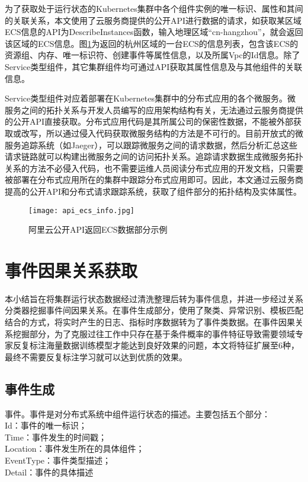 为了获取处于运行状态的Kubernetes集群中各个组件实例的唯一标识、属性和其间的关联关系，本文使用了云服务商提供的公开API进行数据的请求，如获取某区域ECS信息的API为DescribeInstances函数，输入地理区域“cn-hangzhou”，就会返回该区域的ECS信息。图\ref{api_ecs_info}为返回的杭州区域的一台ECS的信息列表，包含该ECS的资源组、内存、唯一标识符、创建事件等属性信息，以及所属Vpc的Id信息。除了Service类型组件，其它集群组件均可通过API获取其属性信息及与其他组件的关联信息。

Service类型组件对应着部署在Kubernetes集群中的分布式应用的各个微服务。微服务之间的拓扑关系与开发人员编写的应用架构结构有关，无法通过云服务商提供的公开API直接获取。分布式应用代码是其所属公司的保密性数据，不能被外部获取或改写，所以通过侵入代码获取微服务结构的方法是不可行的。目前开放式的微服务追踪系统（如Jaeger\cite{mengistu2020distributed}），可以跟踪微服务之间的请求数据，然后分析汇总这些请求链路就可以构建出微服务之间的访问拓扑关系。追踪请求数据生成微服务拓扑关系的方法不必侵入代码，也不需要运维人员阅读分布式应用的开发文档，只需要被部署在分布式应用所在的集群中跟踪分布式应用即可。因此，本文通过云服务商提高的公开API和分布式请求跟踪系统，获取了组件部分的拓扑结构及实体属性。
\begin{figure}[htbp]
    \centering
    \texttt{[image: api\_ecs\_info.jpg]}
    \caption{阿里云公开API返回ECS数据部分示例\label{api_ecs_info}}
\end{figure}

\section{事件因果关系获取}
本小结旨在将集群运行状态数据经过清洗整理后转为事件信息，并进一步经过关系分类器挖掘事件间因果关系。在事件生成部分，使用了聚类、异常识别、模板匹配结合的方式，将实时产生的日志、指标时序数据转为了事件类数据。在事件因果关系挖掘部分，为了克服过往工作中只存在基于条件概率的事件特征导致需要领域专家反复标注海量数据训练模型才能达到良好效果的问题，本文将特征扩展至6种，最终不需要反复标注学习就可以达到优质的效果。
\subsection{事件生成}
\begin{definition}[事件]
    \label{event-define}
    事件。事件是对分布式系统中组件运行状态的描述。主要包括五个部分：
    {\\\qquad
        Id：事件的唯一标识；\\
        Time：事件发生的时间戳；\\\qquad
        Location：事件发生所在的具体组件；\\\qquad
        EventType：事件类型描述；\\\qquad
        Detail：事件的具体描述\\\qquad
    }
\end{definition}

